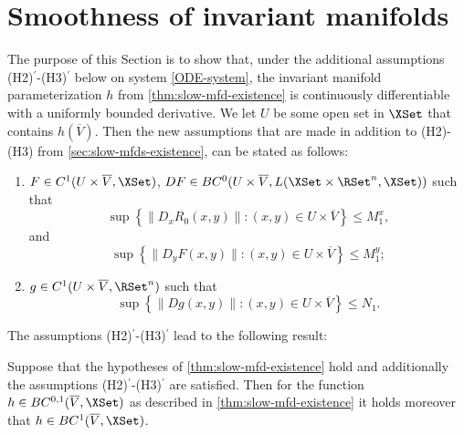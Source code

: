 \documentclass[a4paper]{siamart190516}
\begin{document}
 


\section{Smoothness of invariant manifolds}\label{sec:slow-mfds-smoothness}
The purpose of this Section is to show that, under the additional assumptions
(H2)$^\prime$-(H3)$^\prime$ below on system \cref{ODE-system}, the invariant manifold
parameterization $h$ from \cref{thm:slow-mfd-existence} is continuously
differentiable with a uniformly bounded derivative. We let $U$ be some open set in
$\XSet$ that contains $h(\overline{V})$. Then the new assumptions that are made in
addition to (H2)-(H3) from \cref{sec:slow-mfds-existence}, can be stated as
follows:

\vspace{0.25cm}

 \begin{enumerate}
 \item[$\mathrm{(H2)'}$] $F \in C^1(U \times \overline{V}, \XSet)$, $D F \in BC^0(U \times \overline{V}, L(\XSet \times \RSet^n, \XSet))$ such that
  \[ 
 \sup\left\{\| D_x R_0(x,y) \| : (x,y) \in U \times \overline{V} \right\} \leq M^x_1,
 \]
 and
 \[
 \sup\left\{\| D_y F(x,y) \| : (x,y) \in U \times \overline{V} \right\} \leq M^y_1;
 \]
 \item[$\mathrm{(H3)'}$] $g \in C^1(U \times \overline{V}, \RSet^n)$ such that
 \[
 \sup\left\{\| D g(x,y) \|: (x,y) \in U \times \overline{V} \right \}  \leq N_1.
 \]
 \end{enumerate}
 
 \vspace{0.25cm}
 
 The assumptions (H2)$^\prime$-(H3)$^\prime$ lead to the following result:
 
 \begin{theorem}\label{thm:slow-mfd-smoothness}
Suppose that the hypotheses of \cref{thm:slow-mfd-existence} hold and additionally
the assumptions (H2)$^\prime$-(H3)$^\prime$ are satisfied. Then for the function $h
\in BC^{0,1}(\overline{V},\XSet)$ as described in \cref{thm:slow-mfd-existence} it
holds moreover that $h \in BC^{1}(\overline{V},\XSet)$.
 \end{theorem}
 
\end{document}
